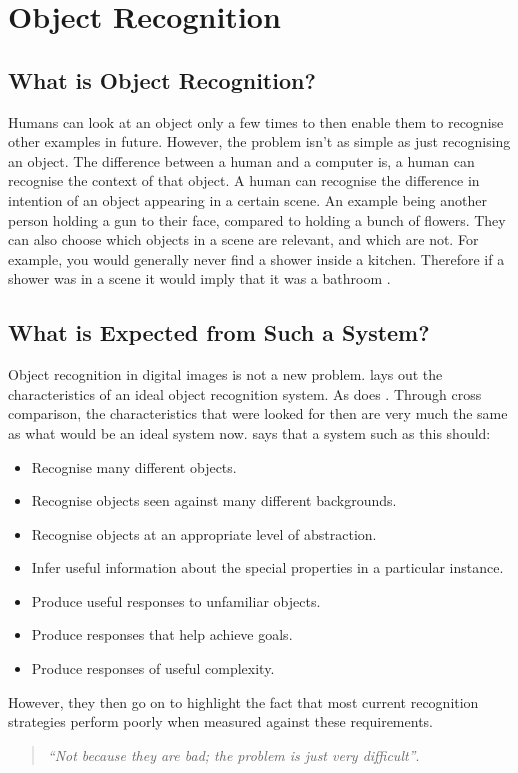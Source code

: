 \documentclass[11pt,oneside]{report}
\begin{document}
			\section{Object Recognition}
				\subsection{What is Object Recognition?}
				Humans can look at an object only a few times to then enable them to recognise other examples in future.
				However, the problem isn't as simple as just recognising an object.
				The difference between a human and a computer is, a human can recognise the context of that object.
				A human can recognise the difference in intention of an object appearing in a certain scene.
				An example being another person holding a gun to their face, compared to holding a bunch of flowers.
				They can also choose which objects in a scene are relevant, and which are not.
				For example, you would generally never find a shower inside a kitchen.
				Therefore if a shower was in a scene it would imply that it was a bathroom \cite{book:modern}.
				
				\subsection{What is Expected from Such a System?}
				Object recognition in digital images is not a new problem.
				 lays out the characteristics of an ideal object recognition system.
				As does .
				Through cross comparison, the characteristics that were looked for then are very much the same as what would be an ideal system now.
				 says that a system such as this should:
				\begin{itemize}
					\item Recognise many different objects.
					\item Recognise objects seen against many different backgrounds.
					\item Recognise objects at an appropriate level of abstraction.
					\item Infer useful information about the special properties in a particular instance.
					\item Produce useful responses to unfamiliar objects.
					\item Produce responses that help achieve goals.
					\item Produce responses of useful complexity.
				\end{itemize}
				However, they then go on to highlight the fact that most current recognition strategies perform poorly when measured against these requirements.
				\begin{quotation}
					\textit{``Not because they are bad; the problem is just very difficult''}.
				\end{quotation}
				
\end{document}
